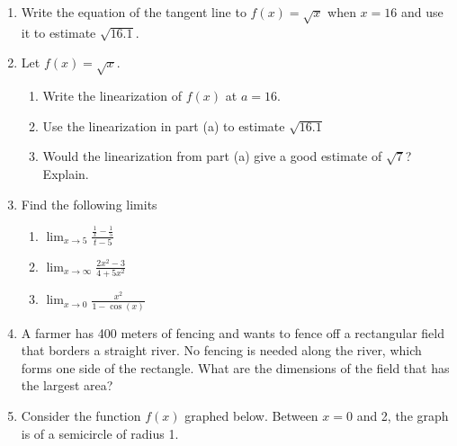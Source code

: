 \documentclass[11pt,fleqn]{article}
\def\ds{\displaystyle}
\begin{document}
\begin{enumerate}
\vfill
\item Write the equation of the tangent line to $f(x)=\sqrt{x}$ when $x=16$ and use it to estimate $\sqrt{16.1}.$
\vspace{1in}
\item Let $f(x) = \sqrt{x}.$
	\begin{enumerate}
	\item Write the linearization of $f(x)$ at $a=16.$
	\vspace{1in}
	\item Use the linearization in part (a) to estimate $\sqrt{16.1}$
	\vspace{1in}
	\item Would the linearization from part (a) give a good estimate of $\sqrt{7}$? Explain.
	\vspace{.2in}
	\end{enumerate}
\newpage
\item Find the following limits
	\begin{enumerate}
	\item $\ds \lim_{x \to 5} \frac{\frac{1}{x}-\frac{1}{5}}{t-5}$
	\vfill
	\item $\ds \lim_{x \to \infty} \frac{2x^2-3}{4+5x^2}$
	\vfill
	\item $\ds \lim_{x \to 0} \frac{x^2}{1-\cos(x)}$
	\vfill
	\end{enumerate}
\item A farmer has 400 meters of fencing and wants to fence off a rectangular field that borders a straight river.
No fencing is needed along the river, which forms one side of the rectangle. What are the dimensions of
the field that has the largest area?
\vspace{3in}
\newpage
\item Consider the function $f(x)$ graphed below. Between $x=0$ and 2, the graph is of a semicircle of radius 1.

\begin{center}
\end{center}


\end{enumerate}
\end{document}
